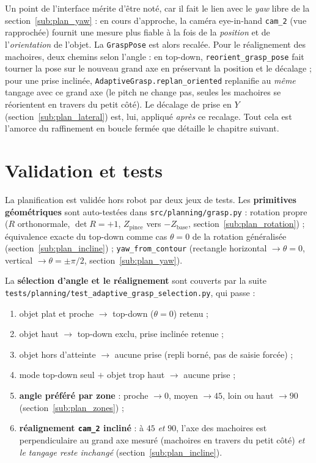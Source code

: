 Un point de l'interface mérite d'être noté, car il fait le lien avec le
\textit{yaw} libre de la section~\ref{sub:plan_yaw} : en cours d'approche, la
caméra eye-in-hand \texttt{cam\_2} (vue rapprochée) fournit une mesure plus fiable
à la fois de la \emph{position} et de l'\emph{orientation} de l'objet. La
\texttt{GraspPose} est alors recalée. Pour le réalignement des machoires, deux
chemins selon l'angle : en top-down, \texttt{reorient\_grasp\_pose} fait tourner la
pose sur le nouveau grand axe en préservant la position et le décalage ; pour une
prise inclinée, \texttt{AdaptiveGrasp.replan\_oriented} replanifie au \emph{même}
tangage avec ce grand axe (le pitch ne change pas, seules les machoires se
réorientent en travers du petit côté). Le décalage de prise en \(Y\)
(section~\ref{sub:plan_lateral}) est, lui, appliqué \emph{après} ce recalage. Tout
cela est l'amorce du raffinement en boucle fermée que détaille le chapitre suivant.

\section{Validation et tests}
\label{sec:plan_validation}

La planification est validée hors robot par deux jeux de tests. Les
\textbf{primitives géométriques} sont auto-testées dans
\texttt{src/planning/grasp.py} : rotation propre (\(R\) orthonormale,
\(\det R = +1\), \(Z_{\text{pince}}\) vers \(-Z_{\text{base}}\),
section~\ref{sub:plan_rotation}) ; équivalence exacte du top-down comme cas
\(\theta = 0\) de la rotation généralisée (section~\ref{sub:plan_incline}) ;
\texttt{yaw\_from\_contour} (rectangle horizontal \(\rightarrow \theta = 0\),
vertical \(\rightarrow \theta = \pm\pi/2\), section~\ref{sub:plan_yaw}).

La \textbf{sélection d'angle et le réalignement} sont couverts par la suite
\texttt{tests/planning/test\_adaptive\_grasp\_selection.py}, qui passe :
\begin{enumerate}
  \item objet plat et proche \(\rightarrow\) top-down (\(\theta = 0\)) retenu ;
  \item objet haut \(\rightarrow\) top-down exclu, prise inclinée retenue ;
  \item objet hors d'atteinte \(\rightarrow\) aucune prise (repli borné, pas de
        saisie forcée) ;
  \item mode top-down seul \(+\) objet trop haut \(\rightarrow\) aucune prise ;
  \item \textbf{angle préféré par zone} : proche \(\rightarrow 0\), moyen
        \(\rightarrow 45\)\textdegree, loin ou haut \(\rightarrow 90\)\textdegree{}
        (section~\ref{sub:plan_zones}) ;
  \item \textbf{réalignement \texttt{cam\_2} incliné} : à \(45\)\textdegree{} \emph{et}
        \(90\)\textdegree, l'axe des machoires est perpendiculaire au grand axe mesuré
        (machoires en travers du petit côté) \emph{et le tangage reste inchangé}
        (section~\ref{sub:plan_incline}).
\end{enumerate}

